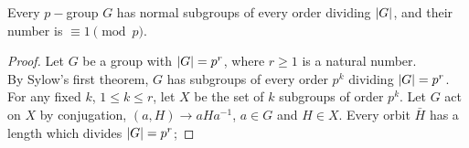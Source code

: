 \documentclass[../main-sheet.tex]{subfiles}
\begin{document}
    \begin{thm}[Frobenius]
        Every \(p-\)group \(G\) has normal subgroups of every order
        dividing \(\left\vert G\right\vert\), and their number is \(\equiv 1 \pmod{p}\).
    \end{thm}
    \begin{proof}
        Let \(G\) be a group with \(\left\vert G\right\vert = p^r\), where \(r \geq 1\) is a natural number.\\
        By Sylow's first theorem, \(G\) has subgroups of every order \(p^k\)  dividing \(\left\vert G\right\vert = p^r\).
        For any fixed \(k \), \(1\leq k \leq r\), let \(X\) be the set of \(k\) subgroups of order \(p^k\).
        Let \(G\) act on \(X\) by conjugation, \((a, H ) \to aHa^{-1}\), \(a \in G\) and \(H\in X\).
        Every orbit \(\bar{H}\) has a length which divides \(\left\vert G\right\vert = p^r\);
    \end{proof}
        
\end{document}
